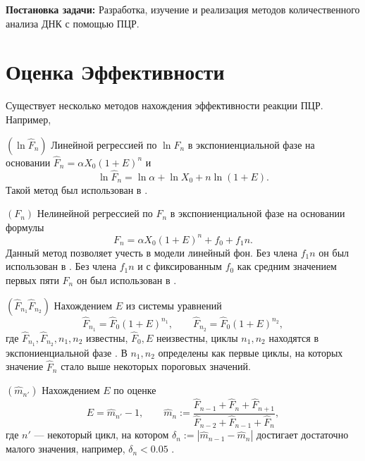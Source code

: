   {\bf Постановка задачи:} Разработка, изучение и реализация методов
количественного анализа ДНК с помощью ПЦР.

\section{Оценка Эффективности}\label{sec:eff}

Существует несколько методов нахождения эффективности реакции ПЦР. Например,
\begin{labeldesc}
  \item[$(\ln\hat F_{n})$]\label{item:method_log}
  Линейной регрессией по $\ln\hat F_{n}$ в экспониенциальной фазе на
  основании $\hat F_{n}=\alpha X_0(1+E)^{n}$ и
  \[
    \ln \hat F_{n}=\ln\alpha + \ln X_0+n\ln(1+E).
  \]
  Такой метод был использован в
  \cite{wiesnerCountingTargetMolecules1992,ramakersAssumptionfreeAnalysisQuantitative2003}.

  \item[$(F_{n})$]\label{item:method_lin}
  Нелинейной регрессией по $F_{n}$ в экспониенциальной фазе на основании
  формулы
  \[
    F_{n}=\alpha X_0(1+E)^{n}+f_0+f_1n.
  \]
  Данный метод позволяет учесть в модели линейный фон. Без члена $f_1n$ он был
  использован в \cite{tichopadStandardizedDeterminationRealtime2003}. Без
  члена $f_1n$ и с фиксированным $f_0$ как средним значением первых пяти
  $F_{n}$ он был использован в \cite{barKineticOutlierDetection2003}.

  \item[$(\hat F_{n_1}\hat F_{n_2})$]\label{item:method_sys}
  Нахождением $E$ из системы уравнений
  \[
    \hat F_{n_1}=\hat F_0(1+E)^{n_1},\qquad \hat F_{n_2}=\hat F_0(1+E)^{n_2},
  \]
  где $\hat F_{n_1},\hat F_{n_2},n_1,n_2$ известны, $\hat F_0,E$ неизвестны,
  циклы $n_1,n_2$ находятся в экспониенциальной фазе
  \cite{liuNewQuantitativeMethod2002}. В \cite{liuNewQuantitativeMethod2002}
  $n_1,n_2$ определены как первые циклы, на которых значение $\hat F_{n}$ стало
  выше некоторых пороговых значений.

  \item[$(\hat m_{n'})$]\label{item:method_estimate}
  Нахождением $E$ по оценке
  \[
    E=\hat m_{n'}-1,\qquad
    \hat m_{n}:=\frac{\hat F_{n-1}+\hat F_{n}+\hat F_{n+1}}
    {\hat F_{n-2}+\hat F_{n-1}+\hat F_{n}},
  \]
  где $n'$ --- некоторый цикл, на котором
  $\delta_{n}:=|\hat m_{n-1}-\hat m_{n}|$ достигает достаточно малого значения,
  например, $\delta_{n}<0.05$ \cite{peccoudStatisticalEstimationsPCR1998}.


\end{labeldesc}
